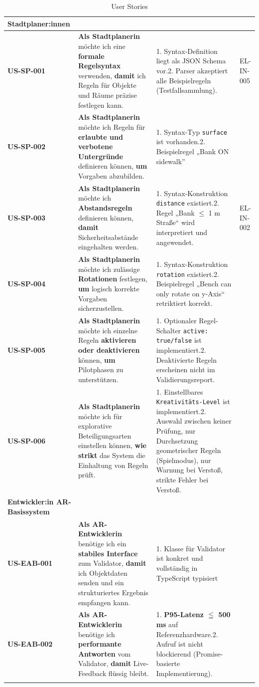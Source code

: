 \begin{longtable}{| p{} | p{} | p{} | p{} |}
\hline\hline
\textbf{Stadtplaner:innen} &  &  \\
\hline
\textbf{US-SP-001} & \textbf{Als Stadtplanerin} möchte ich eine \textbf{formale Regelsyntax} verwenden, \textbf{damit} ich Regeln für Objekte und Räume präzise festlegen kann. & 1. Syntax‐Definition liegt als JSON Schema vor.2. Parser akzeptiert alle Beispielregeln (Testfallsammlung). & EL-IN-005\\
\hline
\textbf{US-SP-002} & \textbf{Als Stadtplanerin} möchte ich Regeln für \textbf{erlaubte und verbotene Untergründe} definieren können, \textbf{um} Vorgaben abzubilden. & 1. Syntax-Typ \verb|surface| ist vorhanden.2. Beispielregel „Bank ON sidewalk” & \\
\hline
\textbf{US-SP-003} & \textbf{Als Stadtplanerin} möchte ich \textbf{Abstandsregeln} definieren können, \textbf{damit} Sicherheitsabstände eingehalten werden. & 1. Syntax-Konstruktion \verb|distance| existiert.2. Regel „Bank $\leq$ 1 m Straße“ wird interpretiert und angewendet. & EL-IN-002\\
\hline
\textbf{US-SP-004} & \textbf{Als Stadtplanerin} möchte ich zulässige \textbf{Rotationen} festlegen, \textbf{um} logisch korrekte Vorgaben sicherzustellen. & 1. Syntax-Konstruktion \verb|rotation| existiert.2. Beispielregel „Bench can only rotate on y-Axis“ retriktiert korrekt. & \\
\hline
\textbf{US-SP-005} & \textbf{Als Stadtplanerin} möchte ich einzelne Regeln \textbf{aktivieren oder deaktivieren} können, \textbf{um} Pilotphasen zu unterstützen. & 1. Optionaler Regel-Schalter \verb|active: true/false| ist implementiert.2. Deaktivierte Regeln erscheinen nicht im Validierungsreport. & \\
\hline
\textbf{US-SP-006} & \textbf{Als Stadtplanerin} möchte ich für explorative Beteiligungsarten einstellen können, \textbf{wie strikt} das System die Einhaltung von Regeln prüft. & 1. Einstellbares \verb|Kreativitäts-Level| ist implementiert.2. Auswahl zwischen keiner Prüfung, nur Durchsetzung geometrischer Regeln (Spielmodus), nur Warnung bei Verstoß, strikte Fehler bei Verstoß. & \\
\hline\hline
\textbf{Entwickler:in AR-Basissystem} &  &  \\
\hline
\textbf{US-EAB-001} & \textbf{Als AR-Entwicklerin} benötige ich ein \textbf{stabiles Interface} zum Validator, \textbf{damit} ich Objektdaten senden und ein strukturiertes Ergebnis empfangen kann. & 1. Klasse für Validator ist konkret und vollständig in TypeScript typisiert & \\
\hline
\textbf{US-EAB-002} & \textbf{Als AR-Entwicklerin} benötige ich \textbf{performante Antworten} vom Validator, \textbf{damit} Live-Feedback flüssig bleibt. & 1. \textbf{P95-Latenz $\leqq$  500 ms} auf Referenzhardware.2. Aufruf ist nicht blockierend (Promise-basierte Implementierung). & \\
\hline

\caption{User Stories}
\label{tab:User Stories}
\end{longtable}
    \egroup
\FloatBarrier    
